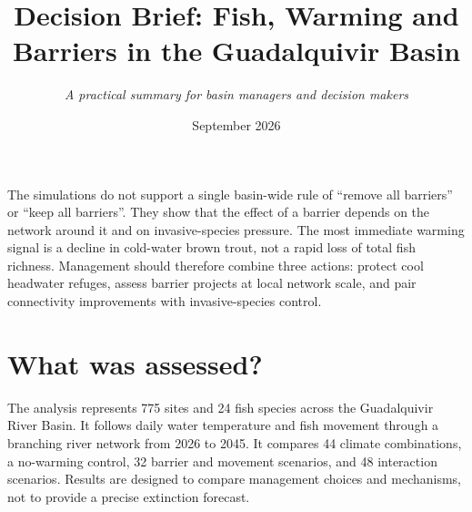 \documentclass[10pt,a4paper]{article}
\title{\vspace{-1.0cm}\textbf{Decision Brief: Fish, Warming and Barriers in the Guadalquivir Basin}}
\author{\textit{A practical summary for basin managers and decision makers}}
\date{September 2026}
\begin{document}
\maketitle
\vspace{-0.5cm}

\begin{tcolorbox}[colback=riverblue!9,colframe=riverblue!70!black,title=\textbf{The decision in one minute},fonttitle=\bfseries]
The simulations do not support a single basin-wide rule of ``remove all barriers'' or ``keep all barriers''. They show that the effect of a barrier depends on the network around it and on invasive-species pressure. The most immediate warming signal is a decline in cold-water brown trout, not a rapid loss of total fish richness. Management should therefore combine three actions: protect cool headwater refuges, assess barrier projects at local network scale, and pair connectivity improvements with invasive-species control.
\end{tcolorbox}

\section*{What was assessed?}

The analysis represents 775 sites and 24 fish species across the Guadalquivir River Basin. It follows daily water temperature and fish movement through a branching river network from 2026 to 2045. It compares 44 climate combinations, a no-warming control, 32 barrier and movement scenarios, and 48 interaction scenarios. Results are designed to compare management choices and mechanisms, not to provide a precise extinction forecast.
\end{document}
